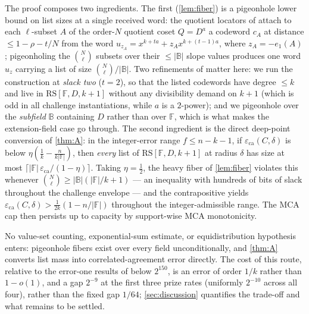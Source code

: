 \documentclass[11pt]{article}
\theoremstyle{definition}
\theoremstyle{remark}
\newcommand{\F}{\mathbb{F}}
\newcommand{\B}{\mathbb{B}}
\newcommand{\RS}{\mathrm{RS}}
\newcommand{\eca}{\varepsilon_{\mathrm{ca}}}
\newcommand{\eone}{e_1}
\begin{document}
The proof composes two ingredients. The first (\cref{lem:fiber}) is a pigeonhole lower bound on list sizes at a single received word: the quotient locators of \cite{Cho26a} attach to each $\ell$-subset $A$ of the order-$N$ quotient coset $Q=D^{a}$ a codeword $c_A$ at distance $\le1-\rho-t/N$ from the word $u_{z_A}=x^{k+ta}+z_Ax^{k+(t-1)a}$, where $z_A=-\eone(A)$; pigeonholing the $\binom N\ell$ subsets over their $\le|\B|$ slope values produces one word $u_z$ carrying a list of size $\binom N\ell/|\B|$. Two refinements of \cite[Main Thm.\,(d)]{Cho26a} matter here: we run the construction at \emph{slack two} ($t=2$), so that the listed codewords have degree $\le k$ and live in $\RS[\F,D,k+1]$ without any divisibility demand on $k+1$ (which is odd in all challenge instantiations, while $a$ is a $2$-power); and we pigeonhole over the \emph{subfield} $\B$ containing $D$ rather than over $\F$, which is what makes the extension-field case go through. The second ingredient is the direct deep-point conversion of \cref{thm:A}: in the integer-error range $f\le n-k-1$, if $\eca(C,\delta)$ is below $\eta(\frac1k-\frac n{k|\F|})$, then \emph{every} list of $\RS[\F,D,k+1]$ at radius $\delta$ has size at most $\lceil|\F|\,\eca/(1-\eta)\rceil$. Taking $\eta=\frac12$, the heavy fiber of \cref{lem:fiber} violates this whenever $\binom N\ell\ge|\B|(|\F|/k+1)$ --- an inequality with hundreds of bits of slack throughout the challenge envelope --- and the contrapositive yields $\eca(C,\delta)>\frac1{2k}(1-n/|\F|)$ throughout the integer-admissible range. The MCA cap then persists up to capacity by support-wise MCA monotonicity.

No value-set counting, exponential-sum estimate, or equidistribution hypothesis enters: pigeonhole fibers exist over every field unconditionally, and \cref{thm:A} converts list mass into correlated-agreement error directly. The cost of this route, relative to the error-one results of \cite{Cho26a,Cho26b} below $2^{150}$, is an error of order $1/k$ rather than $1-o(1)$, and a gap $2^{-9}$ at the first three prize rates (uniformly $2^{-10}$ across all four), rather than the fixed gap $1/64$; \cref{sec:discussion} quantifies the trade-off and what remains to be settled.
\end{document}
